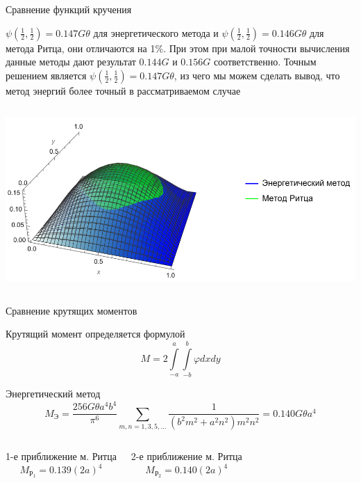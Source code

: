 \documentclass[ignoreonframetext,unicode]{beamer}
\begin{document}
\begin{frame}{Сравнение функций кручения}


\begin{block}{}
	$\psi\left(\frac{1}{2}, \frac{1}{2}\right) = 0.147G\theta$ для энергетического метода и $\psi\left(\frac{1}{2}, \frac{1}{2}\right) = 0.146G\theta$ для метода Ритца, они отличаются на 1\%. При этом при малой точности вычисления данные методы дают результат $0.144G$ и $0.156G$ соответственно. Точным решением является $\psi\left(\frac{1}{2}, \frac{1}{2}\right) = 0.147G\theta$, из чего мы можем сделать вывод, что метод энергий более точный в рассматриваемом случае
\end{block}

\begin{columns}
	\includegraphics[width=1\textwidth]{compare3d}
\end{columns}
	

\end{frame}

\begin{frame}{Сравнение крутящих моментов}
	
	\begin{block}{Крутящий момент определяется формулой}	
	\[
	M = 2 \int\limits_{-a}^a \int\limits_{-b}^b \varphi dx dy
	\]
	\end{block}	
	
	\begin{block}{Энергетический метод}	
\[
	M_{\text{Э}} = \frac{256 G \theta a^4 b^4} {\pi^6}\!\!\!\sum_{m, n = 1, 3, 5, \ldots}\!\!\!\frac{1}{(b^2 m^2 + a^2 n^2 )m^2 n^2}
	= 0.140G\theta a^4
\]
	\end{block}
\begin{columns}
\begin{block}{1-е приближение м. Ритца}
\[
M_{\text{Р}_1} = 0.139(2a)^4
\]
\end{block}
\begin{block}{2-е приближение м. Ритца}
\[
M_{\text{Р}_2} = 0.140(2a)^4
\]
\end{block}
\end{columns}

\end{frame}
\end{document}
